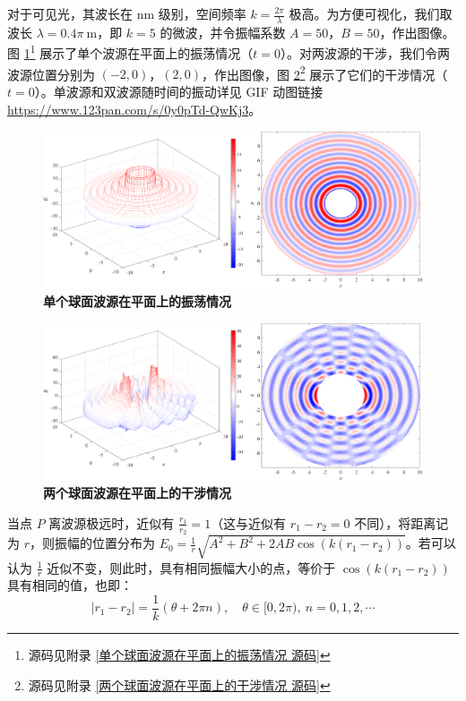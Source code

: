 \documentclass[UTF8]{report}
\theoremstyle{MyLineTheoremStyle} %
\theoremstyle{MyBlockTheoremStyle} %
\theoremstyle{MySubsubsectionStyle} %
\begin{document}
对于可见光，其波长在 nm 级别，空间频率 $k = \frac{2\pi}{\lambda}$ 极高。为方便可视化，我们取波长 $\lambda = 0.4 \pi \ \mathrm{m}$，即 $k = 5$ 的微波，并令振幅系数 $A = 50$，$B = 50$，作出图像。图 \ref{单个球面波源在平面上的振荡情况}\footnote{源码见附录 \ref{单个球面波源在平面上的振荡情况 源码}} 展示了单个波源在平面上的振荡情况（$t = 0$）。对两波源的干涉，我们令两波源位置分别为 $(-2, 0)$，$(2, 0)$，作出图像，图 \ref{两个球面波源在平面上的干涉情况}\footnote{源码见附录 \ref{两个球面波源在平面上的干涉情况 源码}} 展示了它们的干涉情况（$t = 0$）。单波源和双波源随时间的振动详见 GIF 动图链接 \href{https://www.123pan.com/s/0y0pTd-QwKj3}{https://www.123pan.com/s/0y0pTd-QwKj3}。

\begin{figure}[H]\centering
\includegraphics[width=0.95\columnwidth]{assets/3/单个球面波源.pdf}
\caption{\bfseries 单个球面波源在平面上的振荡情况}\label{单个球面波源在平面上的振荡情况}
\end{figure}

\begin{figure}[H]\centering
\includegraphics[width=0.95\columnwidth]{assets/3/两个球面波源.pdf}
\caption{\bfseries 两个球面波源在平面上的干涉情况}\label{两个球面波源在平面上的干涉情况}
\end{figure}

当点 $P$ 离波源极远时，近似有 $\frac{r_1}{r_2} = 1$（这与近似有 $r_1 - r_2 = 0$ 不同），将距离记为 $r$，则振幅的位置分布为 $E_0 = \frac{1}{r} \sqrt{ A^2 + B^2 + 2AB \cos (k(r_1 - r_2))} $。若可以认为 $\frac{1}{r}$ 近似不变，则此时，具有相同振幅大小的点，等价于 $\cos (k(r_1 - r_2))$ 具有相同的值，也即：
\begin{equation}
    | r_1 -  r_2| =  \frac{1}{k} (\theta + 2\pi n),\quad \theta \in [0, 2\pi),\  n = 0,1,2,\cdots
\end{equation}
\end{document}
